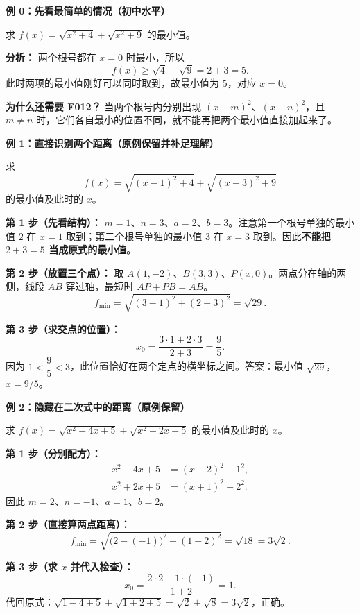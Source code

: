 \clearpage
\begin{examplebox}
\textbf{\textcolor{CExample}{例 0：先看最简单的情况（初中水平）}}



求 $f(x)=\sqrt{x^2+4}+\sqrt{x^2+9}$ 的最小值。

\textbf{分析：} 两个根号都在 $x=0$ 时最小，所以
\[
 f(x)\geq\sqrt4+\sqrt9=2+3=5.
\]
此时两项的最小值刚好可以同时取到，故最小值为 $\boxed5$，对应 $x=0$。

\textbf{为什么还需要 F012？} 当两个根号内分别出现 $(x-m)^2$、$(x-n)^2$，且 $m\ne n$ 时，它们各自最小的位置不同，就不能再把两个最小值直接加起来了。

\medskip
\end{examplebox}
\clearpage
\begin{examplebox}
\textbf{\textcolor{CExample}{例 1：直接识别两个距离（原例保留并补足理解）}}



求
\[
 f(x)=\sqrt{(x-1)^2+4}+\sqrt{(x-3)^2+9}
\]
的最小值及此时的 $x$。

\textbf{第 1 步（先看结构）：} $m=1$、$n=3$、$a=2$、$b=3$。注意第一个根号单独的最小值 $2$ 在 $x=1$ 取到；第二个根号单独的最小值 $3$ 在 $x=3$ 取到。因此\textbf{不能把 $2+3=5$ 当成原式的最小值}。

\textbf{第 2 步（放置三个点）：} 取 $A(1,-2)$、$B(3,3)$、$P(x,0)$。两点分在轴的两侧，线段 $AB$ 穿过轴，最短时 $AP+PB=AB$。
\[
 f_{\min}=\sqrt{(3-1)^2+(2+3)^2}
 =\boxed{\sqrt{29}}.
\]

\textbf{第 3 步（求交点的位置）：}
\[
 x_0=\frac{3\cdot1+2\cdot3}{2+3}=\boxed{\frac95}.
\]
因为 $1<\dfrac95<3$，此位置恰好在两个定点的横坐标之间。答案：最小值 $\sqrt{29}$，$x=9/5$。

\medskip
\end{examplebox}
\clearpage
\begin{examplebox}
\textbf{\textcolor{CExample}{例 2：隐藏在二次式中的距离（原例保留）}}



求 $f(x)=\sqrt{x^2-4x+5}+\sqrt{x^2+2x+5}$ 的最小值及此时的 $x$。

\textbf{第 1 步（分别配方）：}
\[
 \begin{aligned}
 x^2-4x+5&=(x-2)^2+1^2,\\
 x^2+2x+5&=(x+1)^2+2^2.
 \end{aligned}
\]
因此 $m=2$、$n=-1$、$a=1$、$b=2$。

\textbf{第 2 步（直接算两点距离）：}
\[
 f_{\min}=\sqrt{\bigl(2-(-1)\bigr)^2+(1+2)^2}
 =\sqrt{18}=\boxed{3\sqrt2}.
\]

\textbf{第 3 步（求 $x$ 并代入检查）：}
\[
 x_0=\frac{2\cdot2+1\cdot(-1)}{1+2}=\boxed1.
\]
代回原式：$\sqrt{1-4+5}+\sqrt{1+2+5}=\sqrt2+\sqrt8=3\sqrt2$，正确。

\medskip
\end{examplebox}

